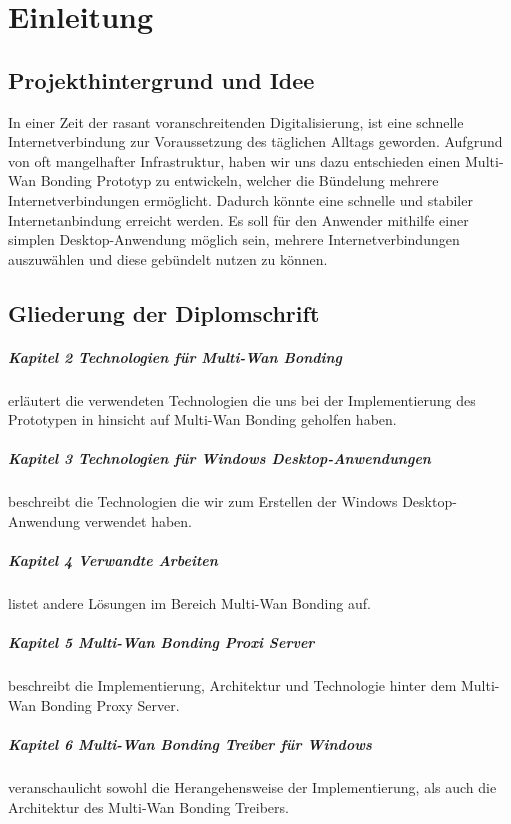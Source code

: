 \chapter{Einleitung}
\label{cha:Einleitung}

\section{Projekthintergrund und Idee}
In einer Zeit der rasant voranschreitenden Digitalisierung, ist eine schnelle Internetverbindung zur Voraussetzung des täglichen Alltags geworden. Aufgrund von oft mangelhafter Infrastruktur, haben wir uns dazu entschieden einen Multi-Wan Bonding Prototyp zu entwickeln, welcher die Bündelung mehrere Internetverbindungen ermöglicht. Dadurch könnte eine schnelle und stabiler Internetanbindung erreicht werden. Es soll für den Anwender mithilfe einer simplen Desktop-Anwendung möglich sein, mehrere Internetverbindungen auszuwählen und diese gebündelt nutzen zu können.
\section{Gliederung der Diplomschrift}
\paragraph{Kapitel 2 Technologien für Multi-Wan Bonding}erläutert die verwendeten Technologien die uns bei der Implementierung des Prototypen in hinsicht auf Multi-Wan Bonding geholfen haben.
\paragraph{Kapitel 3 Technologien für Windows Desktop-Anwendungen}beschreibt die Technologien die wir zum Erstellen der Windows Desktop-Anwendung verwendet haben.
\paragraph{Kapitel 4 Verwandte Arbeiten}listet andere Lösungen im Bereich Multi-Wan Bonding auf. 
\paragraph{Kapitel 5 Multi-Wan Bonding Proxi Server}beschreibt die Implementierung, Architektur und Technologie hinter dem Multi-Wan Bonding Proxy Server.
\paragraph{Kapitel 6 Multi-Wan Bonding Treiber für Windows}veranschaulicht sowohl die Herangehensweise der Implementierung, als auch die Architektur des Multi-Wan Bonding Treibers.
